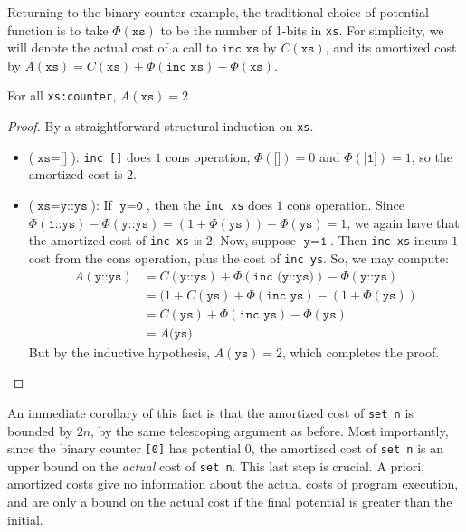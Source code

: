Returning to the binary counter example, the traditional choice of potential function is to take $\Phi(\texttt{xs})$ to be the number of 1-bits in \texttt{xs}.
For simplicity, we will denote the actual cost of a call to $\texttt{inc xs}$ by $C(\texttt{xs})$, and its amortized cost by $A(\texttt{xs}) = C(\texttt{xs}) + \Phi(\texttt{inc xs}) - \Phi(\texttt{xs})$.

\begin{theorem}
For all \texttt{xs:counter}, $A(\texttt{xs}) = 2$
\end{theorem}
\label{thm:bc-phys}
\begin{proof}
By a straightforward structural induction on \texttt{xs}.
\begin{itemize}
  \item ($\texttt{xs} = \texttt{[]}$): \texttt{inc []} does $1$ cons operation, $\Phi(\texttt{[]}) = 0$ and $\Phi(\texttt{[1]}) = 1$, so the amortized cost is $2$.
  \item ($\texttt{xs} = \texttt{y::ys}$): If $\texttt{y} = \texttt{0}$, then the \texttt{inc xs} does $1$ cons operation. Since $\Phi(\texttt{1::ys}) - \Phi(\texttt{y::ys}) = (1 + \Phi(\texttt{ys})) - \Phi(\texttt{ys}) = 1$, we again have that the amortized cost of \texttt{inc xs} is $2$. Now, suppose $\texttt{y} = \texttt{1}$. Then \texttt{inc xs} incurs $1$ cost from the cons operation, plus the cost of \texttt{inc ys}. So, we may compute:
  \begin{align*}
    A(\texttt{y::ys}) &= C(\texttt{y::ys}) + \Phi(\texttt{inc (y::ys)}) - \Phi(\texttt{y::ys})\\
    &= (1 + C(\texttt{ys}) + \Phi(\texttt{inc ys}) - (1 + \Phi(\texttt{ys}))\\
    &= C(\texttt{ys}) + \Phi(\texttt{inc ys}) - \Phi(\texttt{ys})\\
    &= A(\texttt{ys)}
  \end{align*}
  But by the inductive hypothesis, $A(\texttt{ys}) = 2$, which completes the proof.
\end{itemize}
\end{proof}

An immediate corollary of this fact is that the amortized cost of \texttt{set n} is bounded by $2n$, by the same telescoping argument as before. Most importantly, since the binary counter \texttt{[0]} has potential $0$, the amortized cost of \texttt{set n} is an upper bound on the \textit{actual} cost of \texttt{set n}. This last step is crucial. A priori, amortized costs give no information about the actual costs of program execution, and are only a bound on the actual cost if the final potential is greater than the initial.

